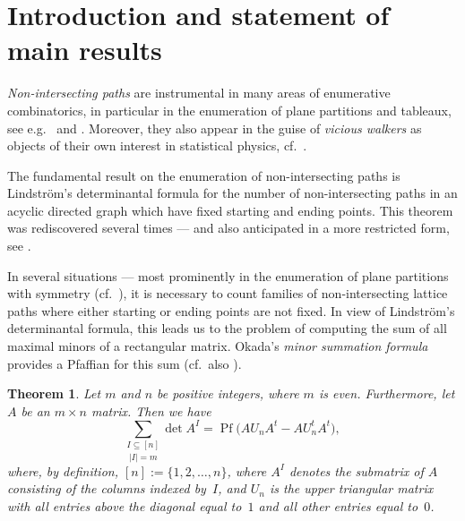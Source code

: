 \documentclass[12pt,reqno]{amsart}
\numberwithin{equation}{section}
\newtheorem{theorem}{Theorem}
\theoremstyle{definition}
\theoremstyle{remark}
\def\Pf{\operatorname{Pf}}
\begin{document}
\maketitle


\section{Introduction and statement of main results}

{\it Non-intersecting paths} are instrumental in many areas of enumerative
combinatorics, in particular in the enumeration of plane partitions
and tableaux, see e.g.\ \cite[Sec.~10.13]{KratCL} and \cite[Sec.~4]{KratCM}.
Moreover, they also appear in the guise of {\it vicious walkers}
as objects of their own interest in statistical physics,
cf.~\cite{FishAA}.

The fundamental result on the enumeration of non-intersecting paths
is Lindstr\"om's determinantal formula \cite[Theorem~1]{LindAA} 
for the number of non-intersecting paths in an acyclic directed graph which
have fixed starting and ending points. This theorem was rediscovered
several times --- and also anticipated in a more restricted form,
see \cite[Footnote~5]{KratBW}.

In several situations --- most prominently in the enumeration of
plane partitions with symmetry (cf.\ \cite[Sec.~6]{KratCM}),
it is necessary to count families of non-intersecting lattice
paths where either starting or ending points are not fixed.
In view of Lindstr\"om's determinantal formula, this leads us to
the problem of computing the sum of all maximal minors of a
rectangular matrix. Okada's {\it minor summation formula}
\cite[Theorem~3]{OkadAA} provides a Pfaffian for this sum
(cf.\ also \cite[Theorem~3.1]{StemAE}).

\begin{theorem} \label{thm:Okada}
Let $m$ and $n$ be positive integers, where $m$ is even.
Furthermore, let $A$ be an $m\times n$ matrix. Then we have
\begin{equation} \label{eq:MS} 
\underset{|I|=m}{\sum_{I\subseteq[n]}}
 \det A^I
 =
\Pf\bigl(AU_nA^t-AU_n^tA^t\bigr),
\end{equation}
where, by definition, $[n]:=\{1,2,\dots,n\}$, where
$A^I$ denotes the submatrix of $A$ consisting of the columns
indexed by~$I$,
and $U_n$ is the upper triangular matrix with all entries
above the diagonal equal to~$1$ and all other entries equal to~$0$.
\end{theorem}
\end{document}
